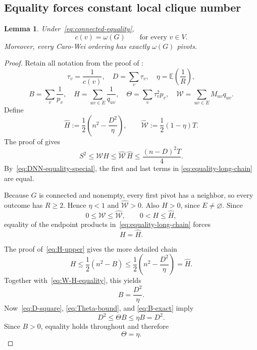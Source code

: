 \documentclass[11pt]{article}
\numberwithin{equation}{section}
\newtheorem{lemma}[theorem]{Lemma}
\theoremstyle{definition}
\theoremstyle{remark}
\newcommand{\E}{\mathbb E}
\begin{document}
	
	\subsection{Equality forces constant local clique number}
	
	\begin{lemma}
		
		\label{lem:local-clique-rigidity}
		Under~\eqref{eq:connected-equality},
		\[
		c(v)=\omega(G)
		\qquad\text{for every }v\in V.
		\]
		Moreover, every Caro-Wei ordering has exactly $\omega(G)$ pivots.
	\end{lemma}
	
	\begin{proof}
		Retain all notation from the proof of :
		\[
		\tau_v=\frac1{c(v)},
		\quad
		D=\sum_v\tau_v,
		\quad
		\eta=\E\left(\frac1R\right),
		\]
		\[
		B=\sum_v\frac1{p_v},
		\quad
		H=\sum_{uv\in E}\frac1{q_{uv}},
		\quad
		\Theta=\sum_v\tau_v^2p_v,
		\quad
		\mathcal W=\sum_{uv\in E}M_{uv}q_{uv}.
		\]
		Define
		\begin{equation}\label{eq:upper-H-W}
			\widehat H
			:=\frac12\left(n^2-\frac{D^2}{\eta}\right),
			\qquad
			\widehat{\mathcal W}
			:=\frac12(1-\eta)T.
		\end{equation}
		The proof of  gives
		\begin{equation}\label{eq:equality-long-chain}
			S^2
			\leq\mathcal W H
			\leq\widehat{\mathcal W}\,\widehat H
			\leq\frac{(n-D)^2T}{4}.
		\end{equation}
		By~\eqref{eq:DNN-equality-special}, the first and last terms in
		\eqref{eq:equality-long-chain} are equal.
		
		Because $G$ is connected and nonempty, every first pivot has a neighbor,
		so every outcome has $R\geq2$.  Hence $\eta<1$ and
		$\widehat{\mathcal W}>0$.  Also $H>0$, since $E\neq\varnothing$.
		Since
		\[
		0\leq\mathcal W\leq\widehat{\mathcal W},
		\qquad
		0<H\leq\widehat H,
		\]
		equality of the endpoint products in~\eqref{eq:equality-long-chain}
		forces
		\begin{equation}\label{eq:W-H-equality}
			H=\widehat H.
		\end{equation}
		
		The proof of~\eqref{eq:H-upper} gives the more detailed chain
		\[
		H
		\leq\frac12(n^2-B)
		\leq\frac12\left(n^2-\frac{D^2}{\eta}\right)
		=\widehat H.
		\]
		Together with~\eqref{eq:W-H-equality}, this yields
		\begin{equation}\label{eq:B-exact}
			B=\frac{D^2}{\eta}.
		\end{equation}
		Now~\eqref{eq:D-square}, \eqref{eq:Theta-bound}, and
		\eqref{eq:B-exact} imply
		\[
		D^2\leq\Theta B\leq\eta B=D^2.
		\]
		Since $B>0$, equality holds throughout and therefore
		\begin{equation}\label{eq:Theta-eta}
			\Theta=\eta.
		\end{equation}
		

\end{proof}
\end{document}
